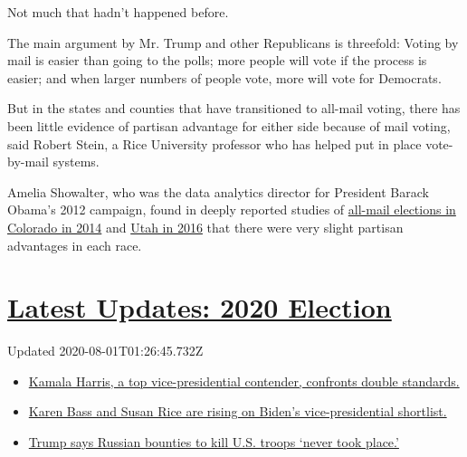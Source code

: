 Not much that hadn't happened before.

The main argument by Mr. Trump and other Republicans is threefold:
Voting by mail is easier than going to the polls; more people will vote
if the process is easier; and when larger numbers of people vote, more
will vote for Democrats.

But in the states and counties that have transitioned to all-mail
voting, there has been little evidence of partisan advantage for either
side because of mail voting, said Robert Stein, a Rice University
professor who has helped put in place vote-by-mail systems.

Amelia Showalter, who was the data analytics director for President
Barack Obama's 2012 campaign, found in deeply reported studies of
\href{https://www.voteathome.org/wp-content/uploads/2018/12/Colorado-2014-voter-turnout-study.pdf}{all-mail
elections in Colorado in 2014} and
\href{https://docs.wixstatic.com/ugd/ef45f5_fcc651c4d4f1456b8340bb4c2cc0ca12.pdf}{Utah
in 2016} that there were very slight partisan advantages in each race.

\hypertarget{latest-updates-2020-election}{%
\section{\texorpdfstring{\href{https://www.nytimes.com/2020/07/31/us/elections/biden-vs-trump.html?action=click\&pgtype=Article\&state=default\&region=MAIN_CONTENT_1\&context=storylines_live_updates}{Latest
Updates: 2020
Election}}{Latest Updates: 2020 Election}}\label{latest-updates-2020-election}}

Updated 2020-08-01T01:26:45.732Z

\begin{itemize}
\tightlist
\item
  \href{https://www.nytimes.com/2020/07/31/us/elections/biden-vs-trump.html?action=click\&pgtype=Article\&state=default\&region=MAIN_CONTENT_1\&context=storylines_live_updates\#link-29fdff45}{Kamala
  Harris, a top vice-presidential contender, confronts double
  standards.}
\item
  \href{https://www.nytimes.com/2020/07/31/us/elections/biden-vs-trump.html?action=click\&pgtype=Article\&state=default\&region=MAIN_CONTENT_1\&context=storylines_live_updates\#link-13ec3d9c}{Karen
  Bass and Susan Rice are rising on Biden's vice-presidential
  shortlist.}
\item
  \href{https://www.nytimes.com/2020/07/31/us/elections/biden-vs-trump.html?action=click\&pgtype=Article\&state=default\&region=MAIN_CONTENT_1\&context=storylines_live_updates\#link-49e9a016}{Trump
  says Russian bounties to kill U.S. troops `never took place.'}
\end{itemize}

